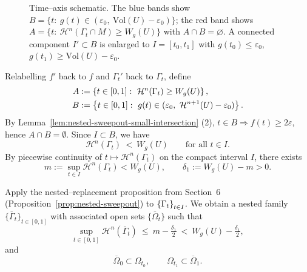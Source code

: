 \begin{figure}[htbp]
  \caption{Time–axis schematic. The blue bands show $B=\{t:\ g(t)\in(\varepsilon_0,\ \mathrm{Vol}(U)-\varepsilon_0)\}$; the red band shows $A=\{t:\ \mathcal H^n(\Gamma_t\cap M)\ge W_g(U)\}$ with $A\cap B=\varnothing$. A connected component $I'\subset B$ is enlarged to $I=[t_0,t_1]$ with $g(t_0)\le\varepsilon_0$, $g(t_1)\ge \mathrm{Vol}(U)-\varepsilon_0$.}
  \label{fig:time-axis-schematic}
\end{figure}

Relabelling $f'$ back to $f$ and $\Gamma_t'$ back to $\Gamma_t$, define
\begin{equation*}
    \begin{split}
        A&:=\br{t\in[0,1]:\ \mathcal{H}^n(\Gamma_t)\ge W_g(U)},\\
        B&:=\br{t\in[0,1]:\ g(t)\in(\varepsilon_0,\ \mathcal{H}^{n+1}(U)-\varepsilon_0)}.
    \end{split}
\end{equation*}
By Lemma~\ref{lem:nested-sweepout-small-intersection} (2), $t\in B\Rightarrow f(t)\ge 2\varepsilon$, hence $A\cap B=\emptyset$. Since $I\subset B$, we have
\begin{equation*}
\mathcal{H}^n(\Gamma_t)\ <\ W_g(U)\qquad\text{for all }t\in I.
\end{equation*}
By piecewise continuity of $t\mapsto \mathcal{H}^n(\Gamma_t)$ on the compact interval $I$, there exists
\begin{equation*}
m:=\sup_{t\in I}\mathcal{H}^n(\Gamma_t) < W_g(U),\qquad
\delta_1:=W_g(U)-m > 0.
\end{equation*}

Apply the nested–replacement proposition from Section~6 (Proposition~\ref{prop:nested-sweepout}) to $\left\{\Gamma_t\right\}_{t\in I}$. 
We obtain a nested family $\{\overline{\Gamma}_t\}_{t\in[0,1]}$ with associated open sets $\{\overline{\Omega}_t\}$ such that
\begin{equation*}
  \sup_{t\in[0,1]}\mathcal{H}^n(\overline{\Gamma}_t)\ \le\ m-\tfrac{\delta_1}{2}\ <\ W_g(U)-\tfrac{\delta_1}{2},
\end{equation*}
and
\begin{equation*}
  \overline{\Omega}_0\subset \Omega_{t_0},\qquad \Omega_{t_1}\subset \overline{\Omega}_1.
\end{equation*}

